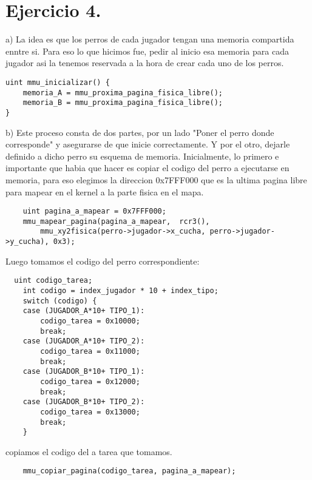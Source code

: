\section{Ejercicio 4.}
a)
La idea es que los perros de cada jugador tengan una memoria compartida enntre si.
Para eso lo que hicimos fue, pedir al inicio esa memoria para cada jugador asi la tenemos reservada a la hora de crear cada uno de los perros.
\begin{codesnippet}
\begin{verbatim}
uint mmu_inicializar() {
    memoria_A = mmu_proxima_pagina_fisica_libre();
    memoria_B = mmu_proxima_pagina_fisica_libre();
}
    \end{verbatim}
\end{codesnippet}

b)
Este proceso consta de dos partes, por un lado "Poner el perro donde corresponde" y asegurarse de que inicie correctamente. Y por el otro, dejarle definido a dicho perro su esquema de memoria.
Inicialmente, lo primero e importante que habia que hacer es copiar el codigo del perro a ejecutarse en memoria, para eso elegimos la direccion 0x7FFF000 que es la ultima pagina libre para mapear en el kernel a la parte fisica en el mapa.
\begin{codesnippet}
\begin{verbatim}
	uint pagina_a_mapear = 0x7FFF000;
    mmu_mapear_pagina(pagina_a_mapear,  rcr3(), 
    	mmu_xy2fisica(perro->jugador->x_cucha, perro->jugador->y_cucha), 0x3); 
    \end{verbatim}
\end{codesnippet}

Luego tomamos el codigo del perro correspondiente:    
\begin{codesnippet}
\begin{verbatim}
  uint codigo_tarea;
    int codigo = index_jugador * 10 + index_tipo;
    switch (codigo) {
    case (JUGADOR_A*10+ TIPO_1):
        codigo_tarea = 0x10000;
        break;
    case (JUGADOR_A*10+ TIPO_2):
        codigo_tarea = 0x11000;
        break;
    case (JUGADOR_B*10+ TIPO_1):
        codigo_tarea = 0x12000;
        break;
    case (JUGADOR_B*10+ TIPO_2):
        codigo_tarea = 0x13000;
        break;
    }
    \end{verbatim}
\end{codesnippet}


copiamos el codigo del a tarea que tomamos.
\begin{codesnippet}
\begin{verbatim}
    mmu_copiar_pagina(codigo_tarea, pagina_a_mapear);
        \end{verbatim}
\end{codesnippet}


